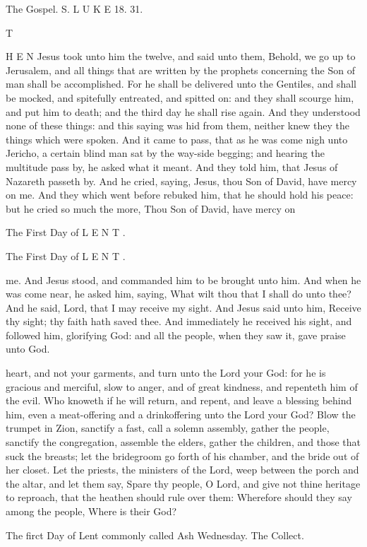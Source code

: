 The Gospel. S. L U K E 18. 31.

T

H E N Jesus took unto him the twelve, and said unto them, Behold, we go up to Jerusalem, and all things that are written by the prophets concerning the Son of man shall be accomplished. For he shall be delivered unto the Gentiles, and shall be mocked, and spitefully entreated, and spitted on: and they shall scourge him, and put him to death; and the third day he shall rise again. And they understood none of these things: and this saying was hid from them, neither knew they the things which were spoken. And it came to pass, that as he was come nigh unto Jericho, a certain blind man sat by the way-side begging; and hearing the multitude pass by, he asked what it meant. And they told him, that Jesus of Nazareth passeth by. And he cried, saying, Jesus, thou Son of David, have mercy on me. And they which went before rebuked him, that he should hold his peace: but he cried so much the more, Thou Son of David, have mercy on

The First Day of L E N T .

The First Day of L E N T .

me. And Jesus stood, and commanded him to be brought unto him. And when he was come near, he asked him, saying, What wilt thou that I shall do unto thee? And he said, Lord, that I may receive my sight. And Jesus said unto him, Receive thy sight; thy faith hath saved thee. And immediately he received his sight, and followed him, glorifying God: and all the people, when they saw it, gave praise unto God.

heart, and not your garments, and turn unto the Lord your God: for he is gracious and merciful, slow to anger, and of great kindness, and repenteth him of the evil. Who knoweth if he will return, and repent, and leave a blessing behind him, even a meat-offering and a drinkoffering unto the Lord your God? Blow the trumpet in Zion, sanctify a fast, call a solemn assembly, gather the people, sanctify the congregation, assemble the elders, gather the children, and those that suck the breasts; let the bridegroom go forth of his chamber, and the bride out of her closet. Let the priests, the ministers of the Lord, weep between the porch and the altar, and let them say, Spare thy people, O Lord, and give not thine heritage to reproach, that the heathen should rule over them: Wherefore should they say among the people, Where is their God?

The firct Day of Lent commonly called Ash Wednesday. The Collect.

